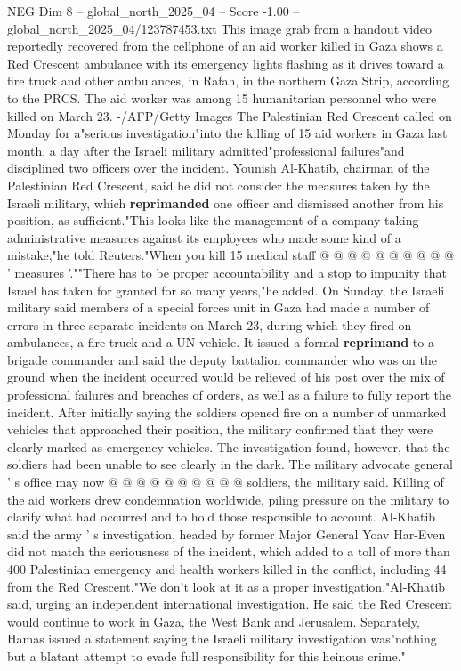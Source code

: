 \begin{textsample}{NEG Dim 8 – global\_north\_2025\_04 – Score -1.00 – global\_north\_2025\_04/123787453.txt}  \label{ex:f8_neg_425}
This image grab from a handout video reportedly recovered from the cellphone of an aid worker killed in Gaza shows a Red Crescent ambulance with its emergency lights flashing as it drives toward a fire truck and other ambulances, in Rafah, in the northern Gaza Strip, according to the PRCS.
The aid worker was among 15 humanitarian personnel who were killed on March 23. -/AFP/Getty Images The Palestinian Red Crescent called on Monday for a"serious investigation"into the killing of 15 aid workers in Gaza last month, a day after the Israeli military admitted"professional failures"and disciplined two officers over the incident.
Younish Al-Khatib, chairman of the Palestinian Red Crescent, said he did not consider the measures taken by the Israeli military, which \textbf{reprimanded} one officer and dismissed another from his position, as sufficient."This looks like the management of a company taking administrative measures against its employees who made some kind of a mistake,"he told Reuters."When you kill 15 medical staff @ @ @ @ @ @ @ @ @ @ ' measures '.""There has to be proper accountability and a stop to impunity that Israel has taken for granted for so many years,"he added.
On Sunday, the Israeli military said members of a special forces unit in Gaza had made a number of errors in three separate incidents on March 23, during which they fired on ambulances, a fire truck and a UN vehicle.
It issued a formal \textbf{reprimand} to a brigade commander and said the deputy battalion commander who was on the ground when the incident occurred would be relieved of his post over the mix of professional failures and breaches of orders, as well as a failure to fully report the incident.
After initially saying the soldiers opened fire on a number of unmarked vehicles that approached their position, the military confirmed that they were clearly marked as emergency vehicles.
The investigation found, however, that the soldiers had been unable to see clearly in the dark.
The military advocate general ' s office may now @ @ @ @ @ @ @ @ @ @ soldiers, the military said.
Killing of the aid workers drew condemnation worldwide, piling pressure on the military to clarify what had occurred and to hold those responsible to account.
Al-Khatib said the army ' s investigation, headed by former Major General Yoav Har-Even did not match the seriousness of the incident, which added to a toll of more than 400 Palestinian emergency and health workers killed in the conflict, including 44 from the Red Crescent."We don't look at it as a proper investigation,"Al-Khatib said, urging an independent international investigation.
He said the Red Crescent would continue to work in Gaza, the West Bank and Jerusalem.
Separately, Hamas issued a statement saying the Israeli military investigation was"nothing but a blatant attempt to evade full responsibility for this heinous crime."

\end{textsample}
